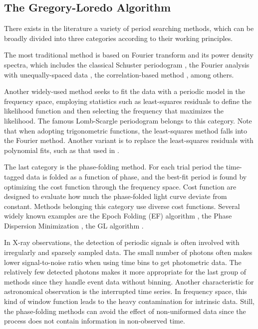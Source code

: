 \documentclass[fleqn,usenatbib]{mnras}
\begin{document}
\subsection{The Gregory-Loredo Algorithm} \label{subsec:GL}
There exists in the literature a variety of period searching methods, which can be broadly divided into three categories according to their working principles. 

The most traditional method is based on Fourier transform and its power density spectra, which includes the classical Schuster periodogram \citep{1898TeMag...3...13S}, the Fourier analysis with unequally-spaced data \citep{1975Ap&SS..36..137D}, the correlation-based method \citep{1988ApJ...333..646E}, among others.

Another widely-used method seeks to fit the data with a periodic model in the frequency space, employing statistics such as least-squares residuals to define the likelihood function and then selecting the frequency that maximizes the likelihood. The famous Lomb-Scargle periodogram \citep[hereafter LS]{1976Ap&SS..39..447L,1982ApJ...263..835S} belongs to this category. Note that when adopting trigonometric functions, the least-squares method falls into the Fourier method. Another variant is to replace the least-squares residuals with polynomial fits, such as that used in \citet{1996ApJ...460L.107S}.

The last category is the phase-folding method. For each trial period the time-tagged data is folded as a function of phase, and the best-fit period is found by optimizing the cost function through the frequency space. Cost function are designed  to evaluate how much the phase-folded light curve deviate from constant.
Methods belonging this category use diverse cost functions. Several widely known examples are the Epoch Folding (EF) algorithm \citep{1983ApJ...266..160L}, the Phase Dispersion Minimization \citep{1978ApJ...224..953S}, the GL algorithm \citep{1992ApJ...398..146G}.

In X-ray observations, the detection of periodic signals is often involved with irregularly and sparsely sampled data. 
The small number of photons often makes lower signal-to-noise ratio when using time bins to get photometric data.
The relatively few detected photons makes it more appropriate for the last group of methods since they handle event data without binning. 
Another characteristic for astronomical observation is the interrupted time series. In frequency space, this kind of window function leads to the heavy contamination for intrinsic data. Still, the phase-folding methods can avoid the effect of non-uniformed data since the process does not contain information in non-observed time. 
\end{document}
